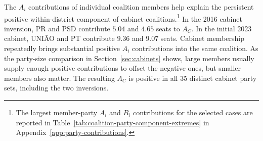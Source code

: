 \documentclass[11pt]{article}
\begin{document}
\begin{table}[htbp]
\centering
\caption{Minimal connected winning inversions and
seat-differential decomposition}
\label{tab:minimal-intervals}
\footnotesize
\setlength{\tabcolsep}{3pt}
\renewcommand{\arraystretch}{1.06}

\end{table}
\FloatBarrier

The \(A_i\) contributions of individual coalition members help explain
the persistent positive within-district component of cabinet
coalitions.\footnote{The largest member-party \(A_i\) and \(B_i\)
contributions for the selected cases are reported in
Table~\ref{tab:coalition-party-component-extremes} in Appendix~\ref{app:party-contributions}.} In the 2016 cabinet inversion,
PR and PSD contribute \(5.04\) and \(4.65\) seats to \(A_C\). In the
initial 2023 cabinet, UNIÃO and PT contribute \(9.36\) and \(9.07\)
seats. Cabinet membership repeatedly brings substantial positive
\(A_i\) contributions into the same coalition. As the party-size
comparison in Section~\ref{sec:cabinets} shows, large members usually
supply enough positive contributions to offset the negative ones, but
smaller members also matter. The resulting \(A_C\) is positive in all
35 distinct cabinet party sets, including the two inversions.

\end{document}
